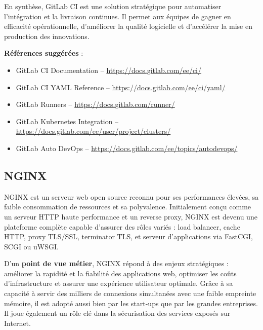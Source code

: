 En synthèse, GitLab CI est une solution stratégique pour automatiser l’intégration et la livraison continues. Il permet aux équipes de gagner en efficacité opérationnelle, d’améliorer la qualité logicielle et d’accélérer la mise en production des innovations.

\textbf{Références suggérées} :
\begin{itemize}
	\item GitLab CI Documentation – \url{https://docs.gitlab.com/ee/ci/}
	\item GitLab CI YAML Reference – \url{https://docs.gitlab.com/ee/ci/yaml/}
	\item GitLab Runners – \url{https://docs.gitlab.com/runner/}
	\item GitLab Kubernetes Integration – \url{https://docs.gitlab.com/ee/user/project/clusters/}
	\item GitLab Auto DevOps – \url{https://docs.gitlab.com/ee/topics/autodevops/}
\end{itemize}

\subsection{NGINX}

NGINX est un serveur web open source reconnu pour ses performances élevées, sa faible consommation de ressources et sa polyvalence. Initialement conçu comme un serveur HTTP haute performance et un reverse proxy, NGINX est devenu une plateforme complète capable d’assurer des rôles variés  : load balancer, cache HTTP, proxy TLS/SSL, terminator TLS, et serveur d’applications via FastCGI, SCGI ou uWSGI.

D’un \textbf{point de vue métier}, NGINX répond à des enjeux stratégiques  : améliorer la rapidité et la fiabilité des applications web, optimiser les coûts d’infrastructure et assurer une expérience utilisateur optimale. Grâce à sa capacité à servir des milliers de connexions simultanées avec une faible empreinte mémoire, il est adopté aussi bien par les start-ups que par les grandes entreprises. Il joue également un rôle clé dans la sécurisation des services exposés sur Internet.

